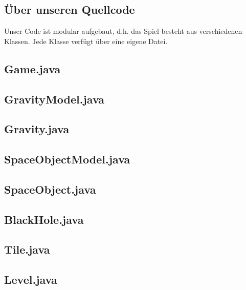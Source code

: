 \subsection{Über unseren Quellcode}
Unser Code ist modular aufgebaut, d.h. das Spiel besteht aus verschiedenen Klassen. Jede Klasse
verfügt über eine eigene Datei.
\subsection{Game.java}
\fontsize{8pt}{10pt}\selectfont


\subsection{GravityModel.java}
\fontsize{8pt}{10pt}\selectfont


\subsection{Gravity.java}
\fontsize{8pt}{10pt}\selectfont


\subsection{SpaceObjectModel.java}
\fontsize{8pt}{10pt}\selectfont


\subsection{SpaceObject.java}
\fontsize{8pt}{10pt}\selectfont


\subsection{BlackHole.java}
\fontsize{8pt}{10pt}\selectfont


\subsection{Tile.java}
\fontsize{8pt}{10pt}\selectfont


\subsection{Level.java}
\fontsize{8pt}{10pt}\selectfont


